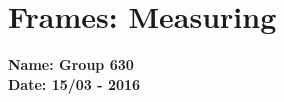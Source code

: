 \chapter{Frames: Measuring}\label{FrameMeasuring} 
\textbf{Name: Group 630}\\
\textbf{Date: 15/03 - 2016}

%
%
